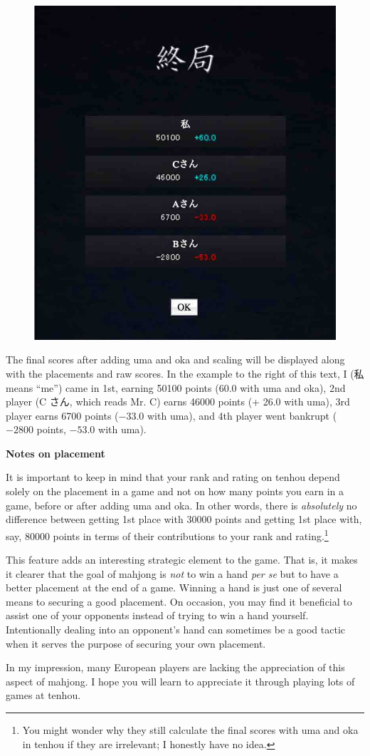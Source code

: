 \begin{figure}
\begin{center}
\includegraphics[width=.4\textwidth,clip]{figs/finalscore.jpg}
\end{center}
\vspace{-25pt}
\end{figure}

\bigskip

The final scores after adding {\jap uma} and {\jap oka} and scaling will be displayed along with the placements and raw scores. In the example to the right of this text, I (私 means ``me'') came in 1st, earning 50100 points (60.0 with {\jap uma} and {\jap oka}), 2nd player (C さん, which reads Mr. C) earns 46000 points (+ 26.0 with {\jap uma}), 3rd player earns 6700 points ($-33.0$ with {\jap uma}), and 4th player went bankrupt ($-2800$ points, $-53.0$ with {\jap uma}). 

\newpage
\begin{boxnote} \small
{\bf\normalsize Notes on placement}

\bigskip
It is important to keep in mind that your rank and rating on {\jap tenhou} depend solely on the placement in a game and not on how many points you earn in a game, before or after adding {\jap uma} and {\jap oka}. In other words, there is \emph{absolutely} no difference between getting 1st place with 30000 points and getting 1st place with, say, 80000 points in terms of their contributions to your rank and rating.\footnote{You might wonder why they still calculate the final scores with {\jap uma} and {\jap oka} in {\jap tenhou} if they are irrelevant; I honestly have no idea.}

\bigskip
This feature adds an interesting strategic element to the game. That is, it makes it clearer that the goal of mahjong is \emph{not} to win a hand \emph{per se} but to have a better placement at the end of a game. Winning a hand is just one of several means to securing a good placement. On occasion, you may find it beneficial to assist one of your opponents instead of trying to win a hand yourself. Intentionally dealing into an opponent's hand can sometimes be a good tactic when it serves the purpose of securing your own placement. 

\bigskip
In my impression, many European players are lacking the appreciation of this aspect of mahjong. I hope you will learn to appreciate it through playing lots of games at {\jap tenhou}.
\vspace{5pt}
\end{boxnote}

